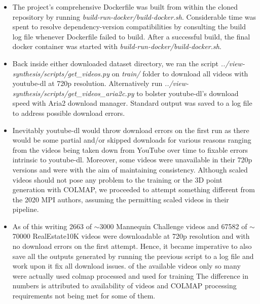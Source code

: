 \begin{itemize}
    \item The project's comprehensive Dockerfile was built from within the cloned repository by running \textit{build-run-docker/build-docker.sh}. Considerable time was spent to resolve dependency-version compatibilities by consulting the build log file whenever Dockerfile failed to build. After a successful build, the final docker container was started with \textit{build-run-docker/build-docker.sh}.
    \item {\sloppy Back inside either downloaded dataset directory, we ran the script \textit{../view-synthesis/scripts/get\_videos.py} on \textit{train/} folder to download all videos with youtube-dl at 720p resolution. Alternatively run \textit{../view-synthesis/scripts/get\_videos\_aria2c.py} to bolster youtube-dl’s download speed with Aria2 download manager. Standard output was saved to a log file to address possible download errors.}  
    \item Inevitably youtube-dl would throw download errors on the first run as there would be some partial and/or skipped downloads for various reasons ranging from the videos being taken down from YouTube over time to fixable errors intrinsic to youtube-dl. Moreover, some videos were unavailable in their 720p versions and were with the aim of maintaining consistency. Although scaled videos should not pose any problem to the training or the 3D point generation with COLMAP, we proceeded to attempt something different from the 2020 MPI authors, assuming the permitting scaled videos in their pipeline.
    \item As of this writing 2663 of $\sim$3000 Mannequin Challenge videos and 67582 of $\sim$70000 RealEstate10K videos were downloadable at 720p resolution and with no download errors on the first attempt. Hence, it became imperative to also save all the outputs generated by running the previous script to a log file and work upon it fix all download issues.
    of the available videos only so many were actually used colmap processed and used for training 
    The difference in numbers is attributed to availability of videos and COLMAP processing requirements not being met for some of them.

    
    
    
    
    
\end{itemize}
